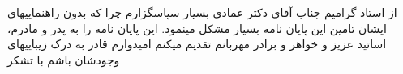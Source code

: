 \begin{acknowledgementpage}

\vspace{1.5cm}

{\nastaliq
{


از استاد گرامیم جناب آقای دکتر عمادی بسیار سپاسگزارم چرا که بدون راهنماییهای ایشان تامین این پایان نامه بسیار مشکل مینمود. 
این پایان نامه را به پدر و مادرم، اساتید عزیز و خواهر و برادر مهربانم تقدیم میکنم  امیدوارم قادر به درک زیباییهای وجودشان باشم با تشکر




















}}\end{acknowledgementpage}
\newpage